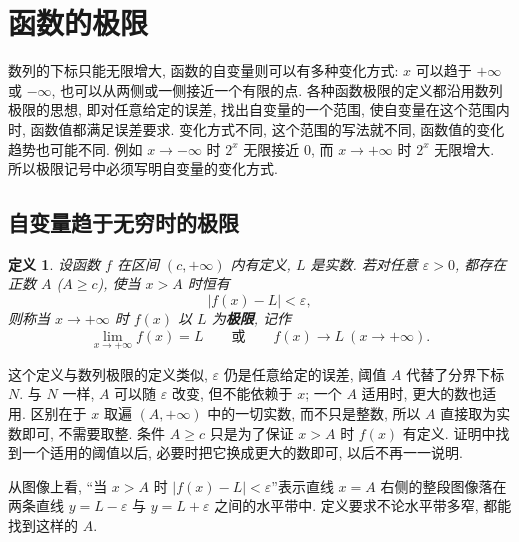 \documentclass[UTF8,openany]{ctexbook}
\theoremstyle{chinesetextbook}
\newtheorem{definition}{定义}[section]
\begin{document}
\section{函数的极限}
数列的下标只能无限增大, 函数的自变量则可以有多种变化方式: $x$ 可以趋于 $+\infty$ 或 $-\infty$, 也可以从两侧或一侧接近一个有限的点. 各种函数极限的定义都沿用数列极限的思想, 即对任意给定的误差, 找出自变量的一个范围, 使自变量在这个范围内时, 函数值都满足误差要求. 变化方式不同, 这个范围的写法就不同, 函数值的变化趋势也可能不同. 例如 $x\to-\infty$ 时 $2^x$ 无限接近 $0$, 而 $x\to+\infty$ 时 $2^x$ 无限增大. 所以极限记号中必须写明自变量的变化方式.
\subsection{自变量趋于无穷时的极限}
\begin{definition}
设函数 $f$ 在区间 $(c,+\infty)$ 内有定义, $L$ 是实数. 若对任意 $\varepsilon>0$, 都存在正数 $A$ ($A\ge c$), 使当 $x>A$ 时恒有
\[
|f(x)-L|<\varepsilon,
\]
则称当 $x\to+\infty$ 时 $f(x)$ 以 $L$ 为\textbf{极限}, 记作
\[
\lim_{x\to+\infty}f(x)=L\qquad\text{或}\qquad f(x)\to L\ (x\to+\infty).
\]
\end{definition}
这个定义与数列极限的定义类似, $\varepsilon$ 仍是任意给定的误差, 阈值 $A$ 代替了分界下标 $N$. 与 $N$ 一样, $A$ 可以随 $\varepsilon$ 改变, 但不能依赖于 $x$; 一个 $A$ 适用时, 更大的数也适用. 区别在于 $x$ 取遍 $(A,+\infty)$ 中的一切实数, 而不只是整数, 所以 $A$ 直接取为实数即可, 不需要取整. 条件 $A\ge c$ 只是为了保证 $x>A$ 时 $f(x)$ 有定义. 证明中找到一个适用的阈值以后, 必要时把它换成更大的数即可, 以后不再一一说明.

从图像上看, “当 $x>A$ 时 $|f(x)-L|<\varepsilon$”表示直线 $x=A$ 右侧的整段图像落在两条直线 $y=L-\varepsilon$ 与 $y=L+\varepsilon$ 之间的水平带中. 定义要求不论水平带多窄, 都能找到这样的 $A$.
\end{document}

